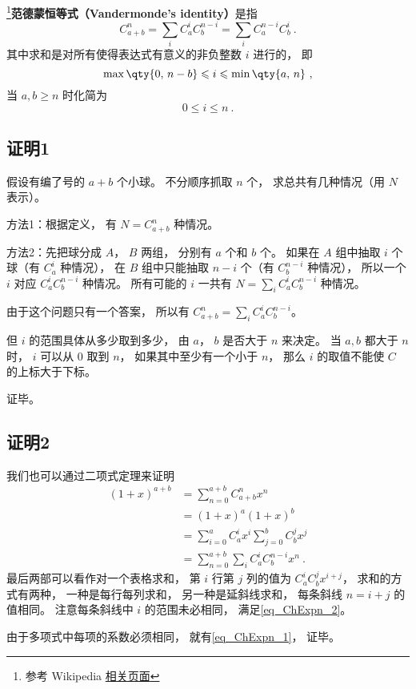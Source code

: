 

\footnote{参考 Wikipedia \href{https://en.wikipedia.org/wiki/Vandermonde's_identity}{相关页面}}\textbf{范德蒙恒等式（Vandermonde's identity）}是指
\begin{equation}\label{eq_ChExpn_1}
C_{a + b}^n = \sum_i C_a^i C_b^{n-i} = \sum\limits_i C_a^{n-i}C_b^i~.
\end{equation}
其中求和是对所有使得表达式有意义的非负整数 $i$ 进行的， 即
\begin{equation}\label{eq_ChExpn_2}
\max\qty{0,\, n-b} \leqslant i \leqslant \min\qty{a,\, n}~,
\end{equation}
当 $a, b \geqslant n$ 时化简为
\begin{equation}
0 \leqslant i \leqslant n~.
\end{equation}


\subsection{证明1}

假设有编了号的 $a+b$ 个小球。 不分顺序抓取 $n$ 个， 求总共有几种情况（用 $N$ 表示）。

方法1：根据定义， 有 $N = C_{a+b}^n$ 种情况。

方法2：先把球分成 $A$，  $B$ 两组， 分别有 $a$ 个和 $b$ 个。 如果在 $A$ 组中抽取 $i$ 个球（有 $C_a^i$ 种情况）， 在 $B$ 组中只能抽取  $n - i$ 个（有 $C_b^{n-i}$ 种情况）， 所以一个 $i$ 对应 $C_a^i C_b^{n-i}$ 种情况。 所有可能的 $i$ 一共有 $N = \sum_i C_a^i C_b^{n-i}$ 种情况。

由于这个问题只有一个答案， 所以有 $C_{a+b}^n = \sum_i C_a^i C_b^{n-i}$。 

但 $i$ 的范围具体从多少取到多少， 由 $a$，  $b$ 是否大于 $n$ 来决定。 当 $a,b$ 都大于 $n$ 时， $i$ 可以从 0 取到 $n$，  如果其中至少有一个小于 $n$，  那么 $i$ 的取值不能使 $C$ 的上标大于下标。

证毕。

\subsection{证明2}
我们也可以通过二项式定理来证明
\begin{equation}
\begin{aligned}
(1 + x)^{a+b} &= \sum_{n=0}^{a+b} C_{a+b}^n x^n\\
&=(1+x)^a (1+x)^b\\
&=\sum_{i=0}^a C_a^i x^i  \sum_{j=0}^b C_b^j x^j\\
&=\sum_{n=0}^{a+b} \sum_{i} C_a^i C_b^{n-i} x^n~.
\end{aligned}
\end{equation}
最后两部可以看作对一个表格求和， 第 $i$ 行第 $j$ 列的值为 $C_a^i C_b^j x^{i+j}$， 求和的方式有两种， 一种是每行每列求和， 另一种是延斜线求和， 每条斜线 $n = i+j$ 的值相同。 注意每条斜线中 $i$ 的范围未必相同， 满足\autoref{eq_ChExpn_2}。

由于多项式中每项的系数必须相同， 就有\autoref{eq_ChExpn_1}， 证毕。
